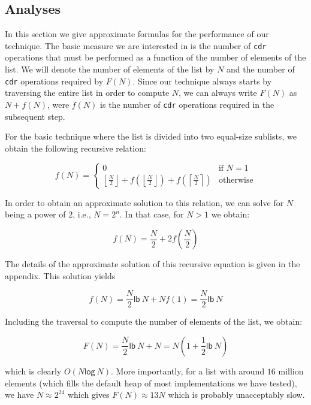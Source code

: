 \subsection{Analyses}
\label{sec-analyses}

In this section we give approximate formulas for the performance of
our technique.
The basic measure we are interested in is the number
of \texttt{cdr} operations that must be performed as a function of the
number of elements of the list.  We will denote the number of elements
of the list by $N$ and the number of \texttt{cdr} operations required
by $F(N)$.  Since our technique always starts by traversing the entire
list in order to compute $N$, we can always write $F(N)$ as $N +
f(N)$, were $f(N)$ is the number of \texttt{cdr} operations required
in the subsequent step.

For the basic technique where the list is divided into two equal-size
sublists, we obtain the following recursive relation:

\label{analyse1}
\[ f(N) = \left\{ \begin{array}{ll}
                    0 & \mbox{if $N = 1$} \\
                    \left\lfloor\frac{N}{2}\right\rfloor
                    + f(\left\lfloor\frac{N}{2}\right\rfloor)
                    + f(\left\lceil\frac{N}{2}\right\rceil) &
                    \mbox{otherwise}
                  \end{array} \right. \]

In order to obtain an approximate solution to this relation, we can
solve for $N$ being a power of $2$, i.e., $N = 2^n$.  In that case,
for $N>1$ we obtain:

\[ f(N) = \frac{N}{2} + 2f(\frac{N}{2}) \]

The details of the approximate solution of this recursive equation
is given in the appendix.
This solution yields

\[ f(N) = \frac{N}{2}\mathsf{lb}~N + Nf(1) = \frac{N}{2}\mathsf{lb}~N\]

Including the traversal to compute the number of elements of the list,
we obtain:

\[ F(N) = \frac{N}{2}\mathsf{lb}~N + N = N(1 + \frac{1}{2}\mathsf{lb}~N)\]

which is clearly $O(N\mathsf{log}~N)$.  More importantly, for a list
with around $16$ million elements (which fills the default heap of most
implementations we have tested), we have $N \approx 2^{24}$ which
gives $F(N) \approx 13N$ which is probably unacceptably slow.

